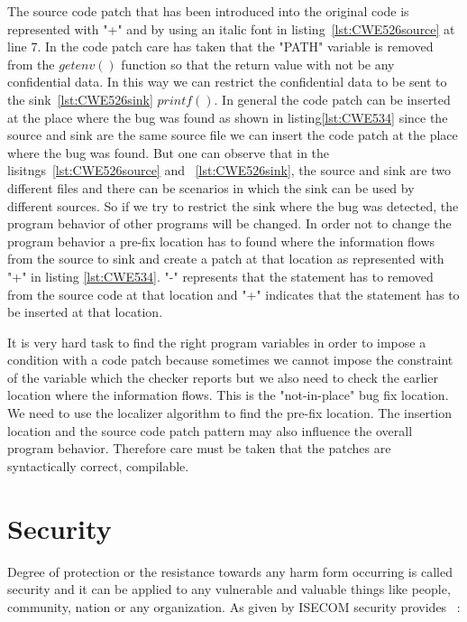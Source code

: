 The source code patch that has been introduced into the original code is represented with "+" and by using an italic font
in listing~\ref{lst:CWE526source} at line 7. In the code patch care has taken that the "PATH" variable is removed from the $getenv()$
function so that the return value with not be any confidential data. In this way we can restrict the confidential data
to be sent to the sink~\ref{lst:CWE526sink} $printf()$. In general the code patch can be inserted at the place where the bug was found 
as shown in listing\ref{lst:CWE534} since the source and sink are the same source file we can insert the code patch at the place 
where the bug was found. But one can observe that in the lisitngs~\ref{lst:CWE526source} and ~\ref{lst:CWE526sink}, the source
and sink are two different files and there can be scenarios in which the sink can be used by different sources. So if we 
try to restrict the sink where the bug was detected, the program behavior of other programs will be changed. In order
not to change the program behavior a pre-fix location has to found where the information flows from the source to sink and create
a patch at that location as represented with "+" in listing \ref{lst:CWE534}. "-" represents that the statement has to removed
from the source code at that location and "+" indicates that the statement has to be inserted at that location.

It is very hard task to find the right program variables in order to impose a condition with a code patch because sometimes
we cannot impose the constraint of the variable which the checker reports but we also need to check the earlier location
where the information flows. This is the "not-in-place" bug fix location. We need to use the localizer algorithm to find
the pre-fix location. The insertion location and the source code patch pattern may also influence the overall program behavior. 
Therefore care must be taken that the patches are syntactically correct, compilable.

\section{Security}


Degree of protection or the resistance towards any harm form occurring is called security and it can be applied to 
any vulnerable and valuable things like people, community, nation or any organization.
As given by ISECOM security provides ~\cite{open:OSSTMM}:\smallskip
 
 
 
